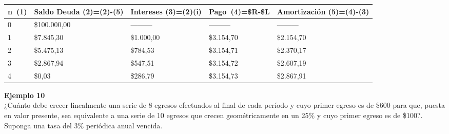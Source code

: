 \begin{itemize}
	\begin{spacing}{1.1}
    \begin{center}
        \begin{tabular}{|p{1cm}|p{2cm}|p{2.1cm}|p{2cm}|p{3cm}|}
        \hline 
        \rowcolor{white!50}
            \textbf{n\ (1)} & \textbf{Saldo Deuda (2)=(2)-(5)} & \textbf{Intereses  (3)=(2)(i)}& \textbf{Pago\ (4)=\$R-\$L }& \textbf{Amortización  (5)=(4)-(3)} \\ \hline                     

            0 & \$100.000,00 & --------- & --------- & ---------\\ \hline 
            1 & \$7.845,30  & \$1.000,00  & \$3.154,70  & \$2.154,70 \\ \hline
            2 & \$5.475,13  & \$784,53  & \$3.154,71  & \$2.370,17 \\ \hline
            3 & \$2.867,94 & \$547,51  & \$3.154,72 & \$2.607,19 \\ \hline
            4 & \$0,03  & \$286,79  & \$3.154,73  & \$2.867,91 \\ \hline

 
\end{tabular}
\end{center}
\end{spacing}
	\end{itemize}
	
	\textbf{Ejemplo 10}\\
	¿Cuánto debe crecer linealmente una serie de 8 egresos efectuados al final de cada período y cuyo primer egreso es de \$600 para que, puesta en valor presente, sea equivalente a una serie de 10 egresos que crecen geométricamente en un 25\% y cuyo primer egreso es de \$100?. Suponga una tasa del 3\% periódica anual vencida.\\
	
